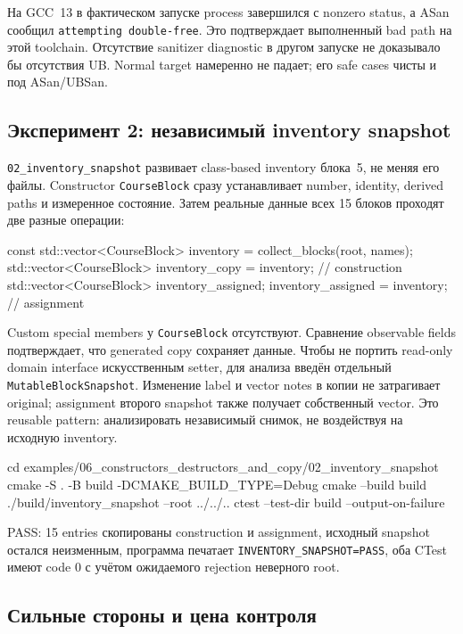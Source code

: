На GCC~13 в фактическом запуске process завершился с nonzero status, а ASan
сообщил \texttt{attempting double-free}. Это подтверждает выполненный bad
path на этой toolchain. Отсутствие sanitizer diagnostic в другом запуске не
доказывало бы отсутствия UB. Normal target намеренно не падает; его safe cases
чисты и под ASan/UBSan.

\subsection{Эксперимент 2: независимый inventory snapshot}

\texttt{02\_inventory\_snapshot} развивает class-based inventory блока~5,
не меняя его файлы. Constructor \texttt{CourseBlock} сразу устанавливает
number, identity, derived paths и измеренное состояние. Затем реальные данные
всех 15 блоков проходят две разные операции:

\begin{cppcode}
const std::vector<CourseBlock> inventory = collect_blocks(root, names);
std::vector<CourseBlock> inventory_copy = inventory; // construction
std::vector<CourseBlock> inventory_assigned;
inventory_assigned = inventory;                      // assignment
\end{cppcode}

Custom special members у \texttt{CourseBlock} отсутствуют. Сравнение
observable fields подтверждает, что generated copy сохраняет данные. Чтобы не
портить read-only domain interface искусственным setter, для анализа введён
отдельный \texttt{MutableBlockSnapshot}. Изменение label и vector notes в
копии не затрагивает original; assignment второго snapshot также получает
собственный vector. Это reusable pattern: анализировать независимый снимок,
не воздействуя на исходную inventory.

\begin{shellcode}
cd examples/06_constructors_destructors_and_copy/02_inventory_snapshot
cmake -S . -B build -DCMAKE_BUILD_TYPE=Debug
cmake --build build
./build/inventory_snapshot --root ../../..
ctest --test-dir build --output-on-failure
\end{shellcode}

PASS: 15 entries скопированы construction и assignment, исходный snapshot
остался неизменным, программа печатает \texttt{INVENTORY\_SNAPSHOT=PASS}, оба
CTest имеют code 0 с учётом ожидаемого rejection неверного root.

\subsection{Сильные стороны и цена контроля}

